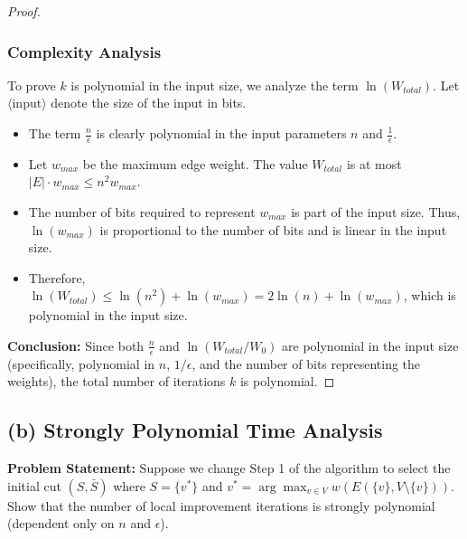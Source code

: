 \begin{proof}
\subsubsection*{Complexity Analysis}
To prove $k$ is polynomial in the input size, we analyze the term $\ln(W_{total})$.
Let $\langle \text{input} \rangle$ denote the size of the input in bits.
\begin{itemize}
    \item The term $\frac{n}{\epsilon}$ is clearly polynomial in the input parameters $n$ and $\frac{1}{\epsilon}$.
    \item Let $w_{max}$ be the maximum edge weight. The value $W_{total}$ is at most $|E| \cdot w_{max} \le n^2 w_{max}$.
    \item The number of bits required to represent $w_{max}$ is part of the input size. Thus, $\ln(w_{max})$ is proportional to the number of bits and is linear in the input size.
    \item Therefore, $\ln(W_{total}) \le \ln(n^2) + \ln(w_{max}) = 2\ln(n) + \ln(w_{max})$, which is polynomial in the input size.
\end{itemize}

\textbf{Conclusion:}
Since both $\frac{n}{\epsilon}$ and $\ln(W_{total}/W_0)$ are polynomial in the input size (specifically, polynomial in $n$, $1/\epsilon$, and the number of bits representing the weights), the total number of iterations $k$ is polynomial.
\end{proof}

\subsection*{(b) Strongly Polynomial Time Analysis}

\textbf{Problem Statement:}
Suppose we change Step 1 of the algorithm to select the initial cut $(S, \bar{S})$ where $S = \{v^*\}$ and $v^* = \arg \max_{v \in V} w(E(\{v\}, V \setminus \{v\}))$. Show that the number of local improvement iterations is strongly polynomial (dependent only on $n$ and $\epsilon$).

